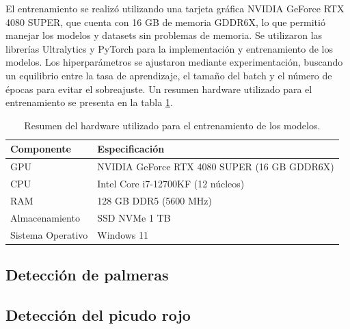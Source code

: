 El entrenamiento se realizó utilizando una tarjeta gráfica NVIDIA GeForce RTX 4080 SUPER, que cuenta con 16 GB de memoria GDDR6X, lo que permitió manejar los modelos y datasets sin problemas de memoria. Se utilizaron las librerías Ultralytics y PyTorch para la implementación y entrenamiento de los modelos. Los hiperparámetros se ajustaron mediante experimentación, buscando un equilibrio entre la tasa de aprendizaje, el tamaño del batch y el número de épocas para evitar el sobreajuste.
Un resumen hardware utilizado para el entrenamiento se presenta en la tabla \ref{tab:hardware-entrenamiento}.

\begin{table}[H]
\centering
\caption{Resumen del hardware utilizado para el entrenamiento de los modelos.}
\label{tab:hardware-entrenamiento}
\begin{tabular}{ l l }
    \toprule
    \textbf{Componente} & \textbf{Especificación}                      \\ \hline
    \midrule
    GPU                 & NVIDIA GeForce RTX 4080 SUPER (16 GB GDDR6X) \\ \hline
    CPU                 & Intel Core i7-12700KF (12 núcleos)           \\ \hline
    RAM                 & 128 GB DDR5 (5600 MHz)                       \\ \hline
    Almacenamiento      & SSD NVMe 1 TB                                \\ \hline
    Sistema Operativo   & Windows 11                                   \\ \hline
    \bottomrule
    \hline
\end{tabular}

\subsection{Detección de palmeras}
\label{sec:deteccionPalmeras}



\subsection{Detección del picudo rojo}
\label{sec:deteccionPicudo}


\end{table}

